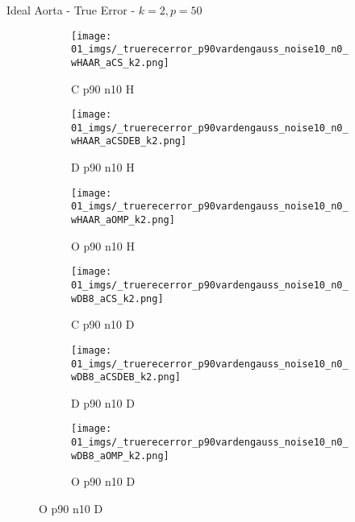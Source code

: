 \begin{frame}{Ideal Aorta - True Error - $k=2,p=50$}{}
\begin{figure}
\begin{subfigure}{0.13\textwidth}
\texttt{[image: 01\_imgs/\_truerecerror\_p90vardengauss\_noise10\_n0\_wHAAR\_aCS\_k2.png]}
\caption*{\tiny C p90 n10 H}
\end{subfigure}
\begin{subfigure}{0.13\textwidth}
\texttt{[image: 01\_imgs/\_truerecerror\_p90vardengauss\_noise10\_n0\_wHAAR\_aCSDEB\_k2.png]}
\caption*{\tiny D p90 n10 H}
\end{subfigure}
\begin{subfigure}{0.13\textwidth}
\texttt{[image: 01\_imgs/\_truerecerror\_p90vardengauss\_noise10\_n0\_wHAAR\_aOMP\_k2.png]}
\caption*{\tiny O p90 n10 H}
\end{subfigure}
\begin{subfigure}{0.13\textwidth}
\texttt{[image: 01\_imgs/\_truerecerror\_p90vardengauss\_noise10\_n0\_wDB8\_aCS\_k2.png]}
\caption*{\tiny C p90 n10 D}
\end{subfigure}
\begin{subfigure}{0.13\textwidth}
\texttt{[image: 01\_imgs/\_truerecerror\_p90vardengauss\_noise10\_n0\_wDB8\_aCSDEB\_k2.png]}
\caption*{\tiny D p90 n10 D}
\end{subfigure}
\begin{subfigure}{0.13\textwidth}
\texttt{[image: 01\_imgs/\_truerecerror\_p90vardengauss\_noise10\_n0\_wDB8\_aOMP\_k2.png]}
\caption*{\tiny O p90 n10 D}
\end{subfigure}

\vspace{5pt}


\end{figure}
\end{frame}
